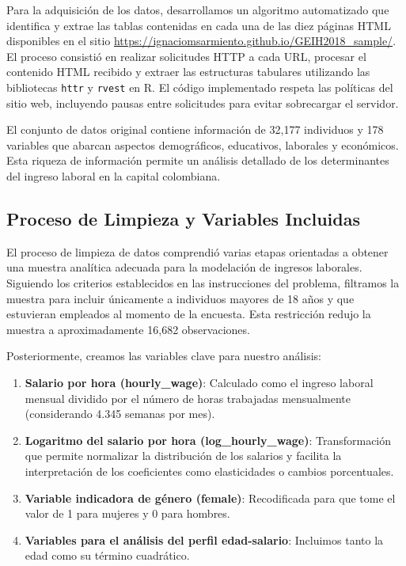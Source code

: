 \documentclass[12pt,a4paper,onecolumn]{article}
\begin{document}
Para la adquisición de los datos, desarrollamos un algoritmo automatizado que identifica y extrae las tablas contenidas en cada una de las diez páginas HTML disponibles en el sitio \url{https://ignaciomsarmiento.github.io/GEIH2018_sample/}. El proceso consistió en realizar solicitudes HTTP a cada URL, procesar el contenido HTML recibido y extraer las estructuras tabulares utilizando las bibliotecas \texttt{httr} y \texttt{rvest} en R. El código implementado respeta las políticas del sitio web, incluyendo pausas entre solicitudes para evitar sobrecargar el servidor.

El conjunto de datos original contiene información de 32,177 individuos y 178 variables que abarcan aspectos demográficos, educativos, laborales y económicos. Esta riqueza de información permite un análisis detallado de los determinantes del ingreso laboral en la capital colombiana.

\subsection{Proceso de Limpieza y Variables Incluidas}

El proceso de limpieza de datos comprendió varias etapas orientadas a obtener una muestra analítica adecuada para la modelación de ingresos laborales. Siguiendo los criterios establecidos en las instrucciones del problema, filtramos la muestra para incluir únicamente a individuos mayores de 18 años y que estuvieran empleados al momento de la encuesta. Esta restricción redujo la muestra a aproximadamente 16,682 observaciones.

Posteriormente, creamos las variables clave para nuestro análisis:

\begin{enumerate}
    \item \textbf{Salario por hora (hourly\_wage)}: Calculado como el ingreso laboral mensual dividido por el número de horas trabajadas mensualmente (considerando 4.345 semanas por mes).
    \item \textbf{Logaritmo del salario por hora (log\_hourly\_wage)}: Transformación que permite normalizar la distribución de los salarios y facilita la interpretación de los coeficientes como elasticidades o cambios porcentuales.
    \item \textbf{Variable indicadora de género (female)}: Recodificada para que tome el valor de 1 para mujeres y 0 para hombres.
    \item \textbf{Variables para el análisis del perfil edad-salario}: Incluimos tanto la edad como su término cuadrático.
\end{enumerate}
\end{document}
